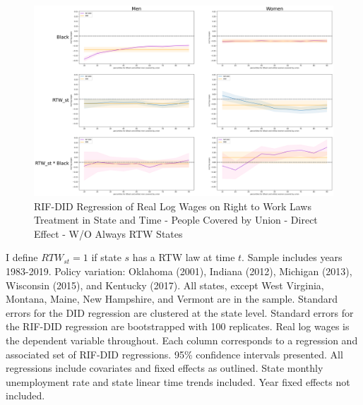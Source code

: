 \documentclass[11pt]{article}
\begin{document}
{\pagebreak
\begin{landscape}
\begin{figure}[ht!]
\centering
    \caption{RIF-DID Regression of Real Log Wages on Right to Work Laws Treatment in State and Time - People Covered by Union - Direct Effect - W/O Always RTW States}\label{fig:rifdid-sltt-wo-ar2w-C}
    \includegraphics[width=1.25\textwidth, height = \textheight, keepaspectratio]{figures/fin_rifdid-sltt-wo-ar2w-C.png}
\end{figure}
\footnotesize{I define $RTW_{st} = 1$ if state $s$ has a RTW law at time $t$. Sample includes years 1983-2019. Policy variation: Oklahoma (2001), Indiana (2012), Michigan (2013), Wisconsin (2015), and Kentucky (2017). All states, except West Virginia, Montana, Maine, New Hampshire, and Vermont are in the sample. Standard errors for the DID regression are clustered at the state level. Standard errors for the RIF-DID regression are bootstrapped with 100 replicates. Real log wages is the dependent variable throughout. Each column corresponds to a regression and associated set of RIF-DID regressions. 95\% confidence intervals presented. All regressions include covariates and fixed effects as outlined. State monthly unemployment rate and state linear time trends included. Year fixed effects not included.}
\end{landscape}

}
\end{document}
